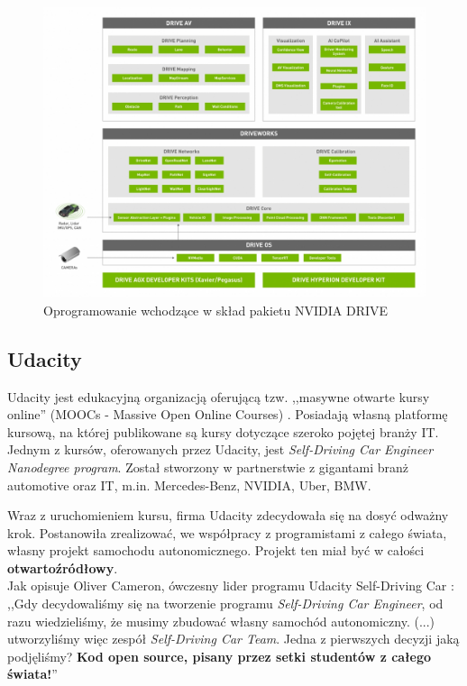 \begin{figure}[h]
\begin{center}
\includegraphics[width=15cm]{resources/figures/nvidia-drive-software-stack.jpg}
\caption{Oprogramowanie wchodzące w skład pakietu NVIDIA DRIVE}
\label{NvidiaDriveSoftwareStack}
\end{center}
\end{figure}

\subsection{Udacity}
Udacity jest edukacyjną organizacją oferującą tzw. ,,masywne otwarte kursy online'' (MOOCs - Massive Open Online Courses) \cite{mooc:guide}. Posiadają własną platformę kursową, na której publikowane są kursy dotyczące szeroko pojętej branży IT. \\
Jednym z kursów, oferowanych przez Udacity, jest \textit{Self-Driving Car Engineer Nanodegree program}. Został stworzony w partnerstwie z gigantami branż automotive oraz IT, m.in. Mercedes-Benz, NVIDIA, Uber, BMW.

Wraz z uruchomieniem kursu, firma Udacity zdecydowała się na dosyć odważny krok. Postanowiła zrealizować, we współpracy z programistami z całego świata, własny projekt samochodu autonomicznego. Projekt ten miał być w całości \textbf{otwartoźródłowy}. \\
Jak opisuje Oliver Cameron, ówczesny lider programu Udacity Self-Driving Car \cite{udacity:selfDrivingCar}: \\
,,Gdy decydowaliśmy się na tworzenie programu  \textit{Self-Driving Car Engineer}, od razu wiedzieliśmy, że musimy zbudować własny samochód autonomiczny. (...) utworzyliśmy więc zespół \textit{Self-Driving Car Team}. Jedna z pierwszych decyzji jaką podjęliśmy? \textbf{Kod open source, pisany przez setki studentów z całego świata!}''

